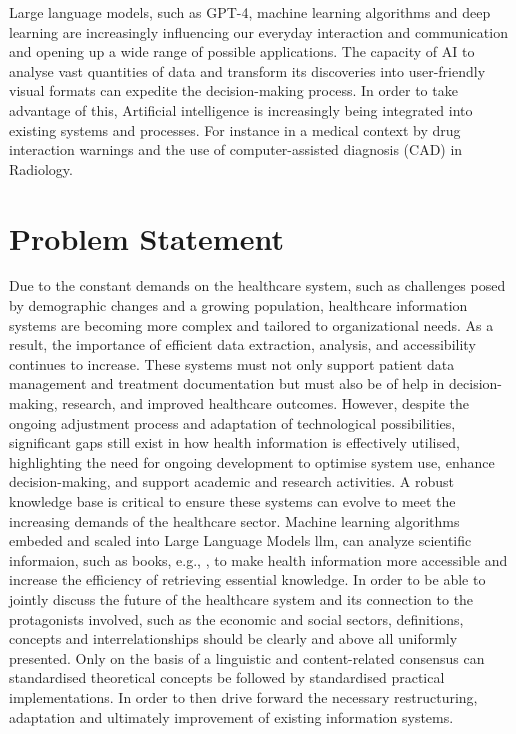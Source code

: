 %
%
Large language models, such as GPT-4, machine learning algorithms and deep learning are increasingly influencing our everyday interaction and communication and opening up a wide range of possible applications. 
The capacity of AI to analyse vast quantities of data and transform its discoveries into user-friendly visual formats can expedite the decision-making process. 
In order to take advantage of this, Artificial intelligence is increasingly being integrated into existing systems and processes. For instance in a medical context by drug interaction warnings\citep{akyon_polypharmacy_2023} and the use of computer-assisted diagnosis (CAD) in Radiology\citep{amisha_ai_medicine_2019}.
%
\section{Problem Statement}
Due to the constant demands on the healthcare system, such as challenges posed by demographic changes and a growing population, healthcare information systems are becoming more complex and tailored to organizational needs. 
As a result, the importance of efficient data extraction, analysis, and accessibility continues to increase. 
These systems must not only support patient data management and treatment documentation but must also be of help in decision-making, research, and improved healthcare outcomes. 
However, despite the ongoing adjustment process and adaptation of technological possibilities, significant gaps still exist in how health information is effectively utilised, highlighting the need for ongoing development to optimise system use, enhance decision-making, and support academic and research activities. 
A robust knowledge base is critical to ensure these systems can evolve to meet the increasing demands of the healthcare sector.
Machine learning algorithms embeded and scaled into Large Language Models \ac{llm}, can analyze scientific informaion, such as books, e.g., \citet{bb2}, to make health information more accessible and increase the efficiency of retrieving essential knowledge. 
In order to be able to jointly discuss the future of the healthcare system and its connection to the protagonists involved, such as the economic and social sectors, definitions, concepts and interrelationships should be clearly and above all uniformly presented. 
Only on the basis of a linguistic and content-related consensus can standardised theoretical concepts be followed by standardised practical implementations. 
In order to then drive forward the necessary restructuring, adaptation and ultimately improvement of existing information systems. 
